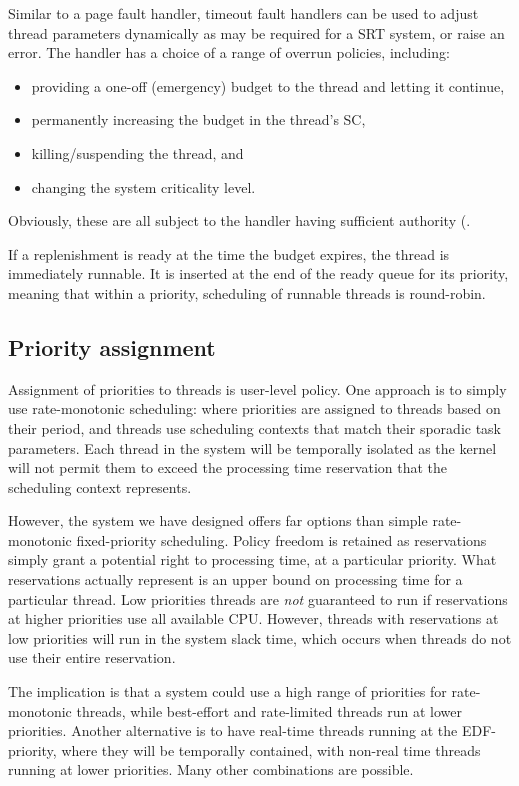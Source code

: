 Similar to a page fault handler, timeout fault handlers can be used to adjust thread parameters dynamically as may be required for a \gls{SRT} system, or raise an error.
The handler has a choice of a range of overrun policies, including:
\begin{itemize}
      \item providing a one-off (emergency) budget to the thread and letting it continue,
       \item permanently increasing the budget in the thread's SC,
       \item killing/suspending the thread, and
       \item changing the system criticality level.
       \end{itemize}
Obviously, these are all subject to the handler having sufficient
authority (\eg {}.

If a replenishment is ready at the time the budget expires, the thread
is immediately runnable. It is inserted at the end of the ready queue
for its priority, meaning that within a priority, scheduling of
runnable threads is round-robin.

\subsection{Priority assignment}

Assignment of priorities to threads is user-level policy. One approach is to simply use
rate-monotonic scheduling: where priorities are assigned to threads based on their period, and
threads use scheduling contexts that match their sporadic task parameters.  Each thread in the
system will be temporally isolated as the kernel will not permit them to exceed the processing time
reservation that the scheduling context represents.

However, the system we have designed offers far options than simple rate-monotonic fixed-priority
scheduling.  Policy freedom is retained as reservations simply grant a potential right to processing
time, at a particular priority.  What reservations actually represent is an upper bound on
processing time for a particular thread.  Low priorities threads are \emph{not} guaranteed to run if
reservations at higher priorities use all available CPU.  However, threads with reservations at low
priorities will run in the system slack time, which occurs when threads do not use their entire
reservation.

The implication is that a system could use a high range of priorities for rate-monotonic threads,
while best-effort and rate-limited threads run at lower priorities.  Another alternative is to have
real-time threads running at the EDF-priority, where they will be temporally contained, with
non-real time threads running at lower priorities.  Many other combinations are possible.

